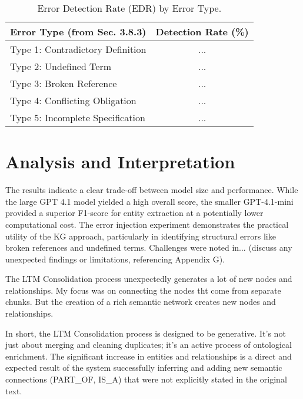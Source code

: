 \begin{table}[h!]
\centering
\caption{Error Detection Rate (EDR) by Error Type.}
\label{tab:edr_results}
\begin{tabular}{|l|c|}
\hline
\textbf{Error Type (from Sec. 3.8.3)} & \textbf{Detection Rate (\%)} \\
\hline
Type 1: Contradictory Definition & ... \\
Type 2: Undefined Term & ... \\
Type 3: Broken Reference & ... \\
Type 4: Conflicting Obligation & ... \\
Type 5: Incomplete Specification & ... \\
\hline
\end{tabular}
\end{table}

\section{Analysis and Interpretation}
\label{sec:analysis}
The results indicate a clear trade-off between model size and performance. While the large GPT 4.1 model yielded a high overall score, the smaller GPT-4.1-mini provided a superior F1-score for entity extraction at a potentially lower computational cost. The error injection experiment demonstrates the practical utility of the KG approach, particularly in identifying structural errors like broken references and undefined terms. Challenges were noted in... (discuss any unexpected findings or limitations, referencing Appendix G).

The LTM Consolidation process unexpectedly generates a lot of new nodes and relationships. My focus was on connecting the nodes tht come from separate chunks. But the creation of a rich semantic network creates new nodes and relationships.

In short, the LTM Consolidation process is designed to be generative. It's not just about merging and cleaning duplicates; it's an active process of ontological enrichment. The significant increase in entities and relationships is a direct and expected result of the system successfully inferring and adding new semantic connections (PART\_OF, IS\_A) that were not explicitly stated in the original text.

